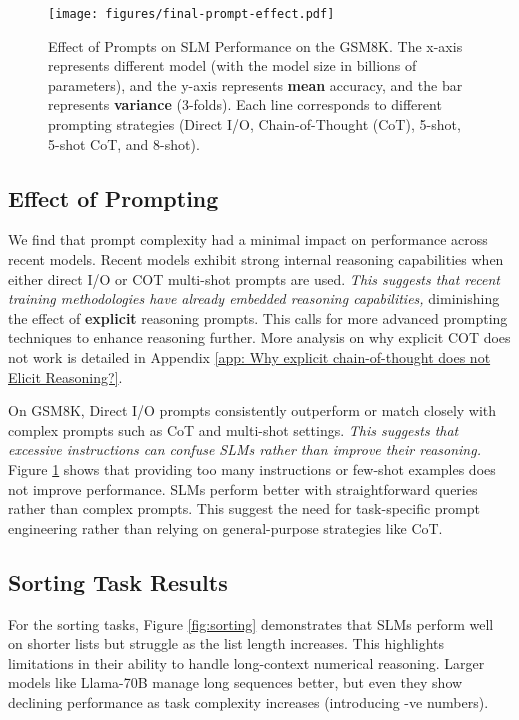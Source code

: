 \begin{figure}[ht]
    \centering
    \texttt{[image: figures/final-prompt-effect.pdf]}
        \caption{Effect of Prompts on SLM Performance on the GSM8K. The x-axis represents different model (with the model size in billions of parameters), and the y-axis represents \textbf{mean} accuracy, and the bar represents \textbf{variance} (3-folds). Each line corresponds to different prompting strategies (Direct I/O, Chain-of-Thought (CoT), 5-shot, 5-shot CoT, and 8-shot).}
    \label{fig:prompt-effect}
\end{figure}

\subsection{Effect of Prompting}
We find that prompt complexity had a minimal impact on performance across recent models. Recent models exhibit strong internal reasoning capabilities when either direct I/O or COT multi-shot prompts are used. \emph{This suggests that recent training methodologies have already embedded reasoning capabilities,} diminishing the effect of \textbf{explicit} reasoning prompts. This calls for more advanced prompting techniques to enhance reasoning further. More analysis on why explicit COT does not work is detailed in Appendix \ref{app: Why explicit chain-of-thought does not Elicit Reasoning?}.

On GSM8K, Direct I/O prompts consistently outperform or match closely with complex prompts such as CoT and multi-shot settings. \emph{This suggests that excessive instructions can confuse SLMs rather than improve their reasoning.} Figure \ref{fig:prompt-effect} shows that providing too many instructions or few-shot examples does not improve performance. SLMs perform better with straightforward queries rather than complex prompts. This suggest the need for task-specific prompt engineering rather than relying on general-purpose strategies like CoT. 

\subsection{Sorting Task Results}
\label{main: Sorting Task Results}
For the sorting tasks, Figure \ref{fig:sorting} demonstrates that SLMs perform well on shorter lists but struggle as the list length increases. This highlights limitations in their ability to handle long-context numerical reasoning. Larger models like Llama-70B manage long sequences better, but even they show declining performance as task complexity increases (introducing -ve numbers).

